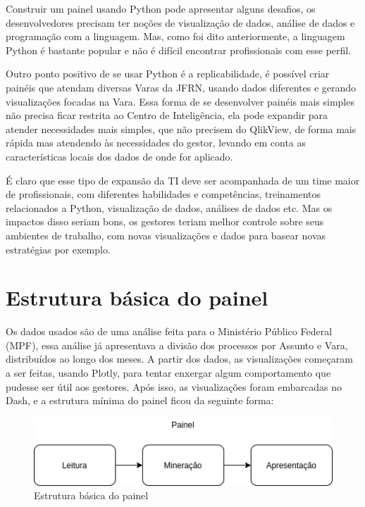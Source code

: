 Construir um painel usando Python pode apresentar alguns desafios, os desenvolvedores precisam ter noções de visualização de dados, análise de dados e programação com a linguagem. Mas, como foi dito anteriormente, a linguagem Python é bastante popular e não é difícil encontrar profissionais com esse perfil.

Outro ponto positivo de se usar Python é a replicabilidade, é possível criar painéis que atendam diversas Varas da JFRN, usando dados diferentes e gerando visualizações focadas na Vara. Essa forma de se desenvolver painéis mais simples não precisa ficar restrita ao Centro de Inteligência, ela pode expandir para atender necessidades mais simples, que não precisem do QlikView, de forma mais rápida mas atendendo às necessidades do gestor, levando em conta as características locais dos dados de onde for aplicado. 

É claro que esse tipo de expansão da TI deve ser acompanhada de um time maior de profissionais, com diferentes habilidades e competências, treinamentos relacionados a Python, visualização de dados, análises de dados etc. Mas os impactos disso seriam bons, os gestores teriam melhor controle sobre seus ambientes de trabalho, com novas visualizações e dados para basear novas estratégias por exemplo.


\section{Estrutura básica do painel}

Os dados usados são de uma análise feita para o Ministério Público Federal (MPF), essa análise já apresentava a divisão dos processos por Assunto e Vara, distribuídos ao longo dos meses. A partir dos dados, as visualizações começaram a ser feitas, usando Plotly, para tentar enxergar algum comportamento que pudesse ser útil aos gestores. Após isso, as visualizações foram embarcadas no Dash, e a estrutura mínima do painel ficou da seguinte forma:

\begin{figure}[h]
	\centering
	\includegraphics[scale=0.65]{./figures/cap2/estrutura_painel.png}
	\caption{Estrutura básica do painel}
\end{figure}


